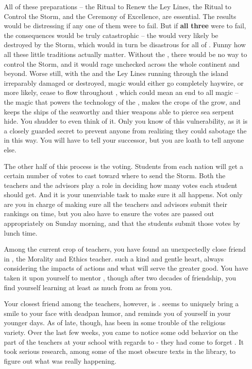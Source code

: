 \documentclass[char]{GL2020}
\begin{document}
All of these preparations – the Ritual to Renew the Ley Lines, the Ritual to Control the Storm, and the Ceremony of Excellence, are essential. The results would be distressing if any one of them were to fail. But if \textbf{all three} were to fail, the consequences would be truly catastrophic – the \pSc{} would very likely be destroyed by the Storm, which would in turn be disastrous for all of \pEarth{}. Funny how all these little traditions actually matter. Without the \pSc{}, there would be no way to control the Storm, and it would rage unchecked across the whole continent and beyond. Worse still, with the \pSc{} and the Ley Lines running through the island irreparably damaged or destroyed, magic would either go completely haywire, or more likely, cease to flow throughout \pEarth{}, which could mean an end to all magic – the magic that powers the technology of the \pTech{}, makes the crops of the \pFarm{} grow, and keeps the ships of the \pShip{} seaworthy and thier weapons able to pierce sea serpent hide. You shudder to even think of it. Only you know of this vulnerability, as it is a closely guarded secret to prevent anyone from realizing they could sabotage the \pSc{} in this way. You will have to tell your successor, but you are loath to tell anyone else.

The other half of this process is the voting. Students from each nation will get a certain number of votes to cast toward where to send the Storm. Both the teachers and the advisors play a role in deciding how many votes each student should get. And it is your unenviable task to make sure it all happens. Not only are you in charge of making sure all the teachers and advisors submit their rankings on time, but you also have to ensure the votes are passed out appropriately on Sunday morning, and that the students submit those votes by lunch time.

Among the current crop of teachers, you have found an unexpectedly close friend in \cEthics{\full}, the Morality and Ethics teacher. \cEthics{\They} \cEthics{\have} such a kind and gentle heart, always considering the impacts of \cEthics{\their} actions and what will serve the greater good. You have taken it upon yourself to mentor \cEthics{\them}, though after two decades of friendship, you find yourself learning at least as much from \cEthics{\them} as \cEthics{\they} \cEthics{\does} from you.

Your closest friend among the teachers, however, is \cChupAvenger{\full}. \cChupAvenger{} seems to uniquely bring a smile to your face with \cChupAvenger{\their} deadpan humor, and reminds you of yourself in your younger days. As of late, though, \cChupAvenger{} has been in some trouble of the religious variety. Over the last few weeks, you came to notice some odd behavior on the part of the teachers at your school with regards to \cChupAvenger{} - they had come to forget \cChupAvenger{\them}. It took serious research, among some of the most obscure texts in the library, to figure out what was really happening. 
\end{document}
